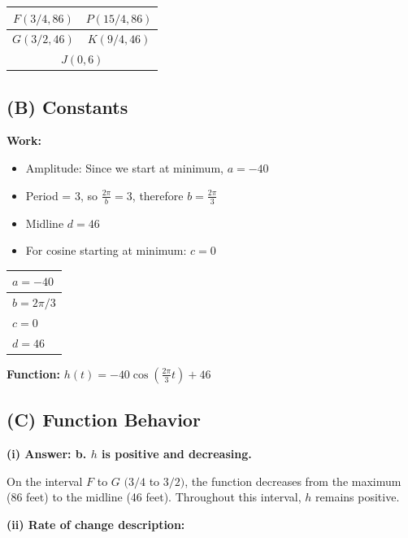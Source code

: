 \documentclass[11pt]{article}
\begin{document}
\begin{center}
\begin{tabular}{|c|c|}
\hline
$F(3/4, 86)$ & $P(15/4, 86)$ \\
\hline
$G(3/2, 46)$ & $K(9/4, 46)$ \\
\hline
\multicolumn{2}{|c|}{$J(0, 6)$} \\
\hline
\end{tabular}
\end{center}

\subsection*{(B) Constants}

\textbf{Work:}
\begin{itemize}[noitemsep]
    \item Amplitude: Since we start at minimum, $a = -40$
    \item Period = 3, so $\displaystyle\frac{2\pi}{b} = 3$, therefore $\displaystyle b = \frac{2\pi}{3}$
    \item Midline $d = 46$
    \item For cosine starting at minimum: $c = 0$
\end{itemize}

\begin{center}
\begin{tabular}{|l|}
\hline
$a = -40$ \\[10pt]
\hline
$b = 2\pi/3$ \\[10pt]
\hline
$c = 0$ \\[10pt]
\hline
$d = 46$ \\[10pt]
\hline
\end{tabular}
\end{center}

\textbf{Function:} $\displaystyle h(t) = -40 \cos\left(\frac{2\pi}{3} t\right) + 46$

\subsection*{(C) Function Behavior}

\textbf{(i) Answer: b. $h$ is positive and decreasing.}

On the interval $F$ to $G$ $(3/4$ to $3/2)$, the function decreases from the maximum (86 feet) to the midline (46 feet). Throughout this interval, $h$ remains positive.

\vspace{0.5cm}
\textbf{(ii) Rate of change description:}
\end{document}

